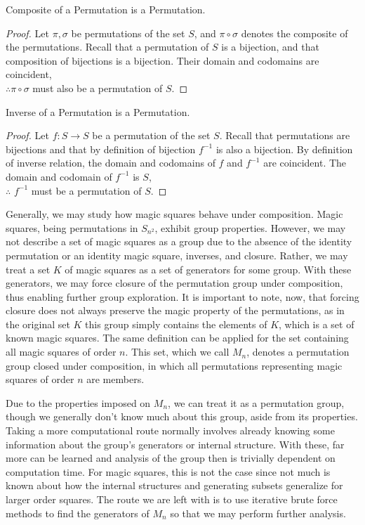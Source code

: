 \documentclass{rhumj_new}
\begin{document}
\begin{thm} Composite of a Permutation is a Permutation.
\end{thm}\label{thmcomp}

\begin{proof}
  Let $\pi,\sigma$ be permutations of the set $S$, and $\pi\circ\sigma$ denotes the composite of
  the permutations. Recall that a permutation of $S$ is a bijection, and that composition of
  bijections is a bijection. Their domain and codomains are coincident,\\ $\therefore
    \pi\circ\sigma$
  must also be a permutation of $S$.
\end{proof}

\begin{thm} Inverse of a Permutation is a Permutation.
\end{thm}\label{thminv}

\begin{proof}
  Let $f : S \rightarrow S$ be a permutation of the set $S$. Recall that permutations are
  bijections and that by definition of bijection $f^{-1}$ is also a bijection. By definition of
  inverse relation, the domain and codomains of $f$ and $f^{-1}$ are coincident. The domain and
  codomain of $f^{-1}$ is $S$,\\ $\therefore$ $f^{-1}$ must be a permutation of $S$.
\end{proof}

Generally, we may study how magic squares behave under composition. Magic squares, being
permutations in $S_{n^2}$, exhibit group properties. However, we may not describe a set of magic
squares as a group due to the absence of the identity permutation or an identity magic square,
inverses, and closure. Rather, we may treat a set $K$ of magic squares as a set of generators for
some group. With these generators, we may force closure of the permutation group under composition,
thus enabling further group exploration. It is important to note, now, that forcing closure does
not always preserve the magic property of the permutations, as in the original set $K$
\textemdash{}
this group simply contains the elements of $K$, which is a set of known magic squares. The same
definition can be applied for the set containing all magic squares of order $n$. This set, which we
call $M_n$, denotes a permutation group closed under composition, in which all permutations
representing magic squares of order $n$ are members.

Due to the properties imposed on $M_n$, we can treat it as a permutation group, though we
generally don't know much about this group, aside from its properties. Taking a more computational
route normally involves already knowing some information about the group's generators or internal
structure. With these, far more can be learned and analysis of the group then is trivially
dependent on computation time. For magic squares, this is not the case since not much is known
about how the internal structures and generating subsets generalize for larger order squares. The
route we are left with is to use iterative brute force methods to find the generators of $M_n$ so
that we may perform further analysis.
\end{document}
